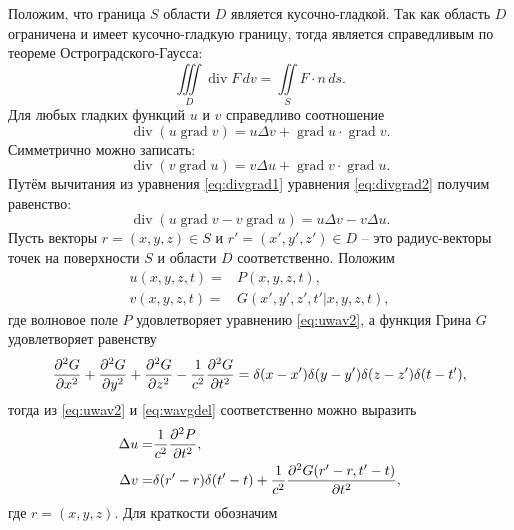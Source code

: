 \documentclass[a4paper, fontsize=14pt]{article}
\newcommand{\divop}{\operatorname{div}}
\newcommand{\gradop}{\operatorname{grad}}
\begin{document}
	 Положим, что граница $S$ области $D$ является кусочно-гладкой. Так как область $D$ ограничена и имеет кусочно-гладкую границу, тогда является справедливым по
	теореме Остроградского-Гаусса:
	\begin{equation}
		\iiint\limits_D \divop F \, dv = \iint\limits_S F \cdot n \, ds.
		\label{eq:vgauss}
	\end{equation}
	Для любых гладких функций $u$ и $v$ справедливо соотношение 
	\begin{equation}
		\divop (u \gradop v) = u\Delta v + \gradop u \cdot \gradop v.
		\label{eq:divgrad1}
	\end{equation}
	Симметрично можно записать:
	\begin{equation}
		\divop (v \gradop u) = v\Delta u + \gradop v \cdot \gradop u.
		\label{eq:divgrad2}
	\end{equation}
	Путём вычитания из уравнения \eqref{eq:divgrad1} уравнения \eqref{eq:divgrad2} получим равенство:
	\begin{equation}
		\divop (u \gradop v - v \gradop u)  = u\Delta v - v \Delta u.
		\label{eq:divgraddiff}
	\end{equation}
	Пусть векторы $r = (x,y,z) \in S$ и $r' = (x',y',z') \in D$ -- это радиус-векторы точек на поверхности $S$ и области $D$ соответственно.
	Положим 
	\begin{align}
		u(x,y,z,t) =& P(x,y,z,t),\label{eq:subsu}\\
		v(x,y,z,t) = &G(x',y',z',t'|x,y,z,t),\label{eq:subsv}
	\end{align}
	где волновое поле $P$ удовлетворяет уравнению \eqref{eq:uwav2}, 
	а функция Грина $G$ удовлетворяет равенству 
	\begin{equation}
		\diff[2]{G}{x}  + \diff[2]{G}{y} +
		\diff[2]{G}{z}  - \frac{1}{c^2} \frac{\partial^2 G}{\partial
			t^2} = \delta(x-x')\delta(y-y')\delta(z-z')\delta(t-t'),
		\label{eq:wavgdel}
	\end{equation}
	тогда из \eqref{eq:uwav2} и \eqref{eq:wavgdel} соответственно можно выразить 
\begin{align}
	\Delta u =& \frac{1}{c^2} \diff[2]{P}{t},\label{eq:subsdu}\\
	\Delta v = &\delta (r' - r) \delta(t' - t) + \frac{1}{c^2} \diff [2]{G(r' -r,t'-t)}{t},\label{eq:subsdv}
\end{align}
где $r=(x,y,z)$. Для краткости обозначим
\end{document}
